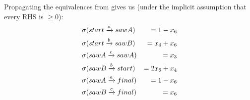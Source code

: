 \documentclass[acmsmall,review,anonymous,screen]{acmart}\settopmatter{printfolios=true,printccs=false,printacmref=true}
\theoremstyle{definition}
\begin{document}
Propagating the equivalences from \FlowEq{} gives us (under the implicit
assumption that every RHS is $\geq 0$):
\begin{equation*}
  \begin{aligned}
    & \operatorname{\sigma}(start \xrightarrow{a} sawA) & = 1 - x_6 \\
    & \operatorname{\sigma}(start \xrightarrow{b} sawB) & = x_4 + x_6 \\
    & \operatorname{\sigma}(sawA \xrightarrow{c} sawA)  & = x_3  \\
    & \operatorname{\sigma}(sawB \xrightarrow{b} start) & = 2x_6 + x_4 \\
    & \operatorname{\sigma}(sawA \xrightarrow{a} final) & = 1 - x_6 \\
    & \operatorname{\sigma}(sawB \xrightarrow{c} final) & = x_6 \\
  \end{aligned}
\end{equation*}
\end{document}
